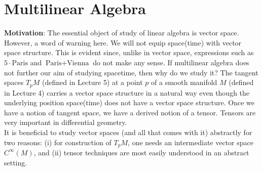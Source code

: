 \section{Multilinear Algebra}

\begin{framed}
\textbf{Motivation}: The essential object of study of linear algebra is vector space. However, a word of warning here. We will not equip space(time) with vector space structure. This is evident since, unlike in vector space, expressions such as $5 \cdot \text{Paris}$ and $\text{Paris} + \text{Vienna}$ do not make any sense. If multilinear algebra does not further our aim of studying spacetime, then why do we study it? The tangent spaces $T_pM$ (defined in Lecture 5) at a point $p$ of a smooth manifold $M$ (defined in Lecture 4) carries a vector space structure in a natural way even though the underlying position space(time) does not have a vector space structure. Once we have a notion of tangent space, we have a derived notion of a tensor. Tensors are very important in differential geometry. \\
It is beneficial to study vector spaces (and all that comes with it) abstractly for two reasons: (i) for construction of $T_pM$, one needs an intermediate vector space $C^{\infty}(M)$, and (ii) tensor techniques are most easily understood in an abstract setting.
\end{framed}

